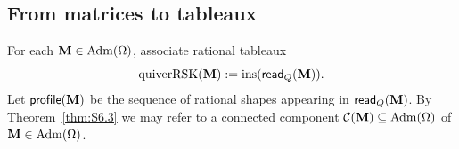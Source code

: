 \documentclass[12pt]{amsart}
\DeclareMathOperator{\Std}{\operatorname{Adm}}
\DeclareMathOperator{\ins}{\operatorname{ins}}
\theoremstyle{definition}
\theoremstyle{remark}
\begin{document}
%
%
%


\subsection{From matrices to tableaux}
For each ${\bf M}\in \Std(\Omega)$, associate  rational tableaux 
\[\operatorname{quiverRSK}({\bf M}) := \ins({\sf read}_Q({\bf M})).\]  
Let ${\sf profile}({\bf M})$ be the sequence of rational shapes appearing in ${\sf read}_Q({\bf M})$. 
By Theorem~\ref{thm:S6.3} we may refer to a connected component $\mathcal{C}({\bf M})\subseteq
\Std(\Omega)$ of ${\bf M}\in \Std(\Omega)$. 
\end{document}
